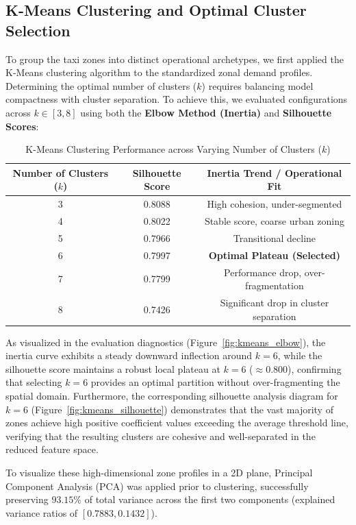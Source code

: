 \documentclass[11pt,a4paper]{article}
\begin{document}
\subsection{K-Means Clustering and Optimal Cluster Selection}
To group the taxi zones into distinct operational archetypes, we first applied the K-Means clustering algorithm to the standardized zonal demand profiles. Determining the optimal number of clusters ($k$) requires balancing model compactness with cluster separation. To achieve this, we evaluated configurations across $k \in [3, 8]$ using both the \textbf{Elbow Method (Inertia)} and \textbf{Silhouette Scores}:
\begin{table}[htbp]
    \centering
    \caption{K-Means Clustering Performance across Varying Number of Clusters ($k$)}
    \label{tab:kmeans_evaluation}
    \begin{tabular}{ccc}
        \toprule
        \textbf{Number of Clusters ($k$)} & \textbf{Silhouette Score} & \textbf{Inertia Trend / Operational Fit} \\
        \midrule
        3 & 0.8088 & High cohesion, under-segmented \\
        4 & 0.8022 & Stable score, coarse urban zoning \\
        5 & 0.7966 & Transitional decline \\
        6 & 0.7997 & \textbf{Optimal Plateau (Selected)} \\
        7 & 0.7799 & Performance drop, over-fragmentation \\
        8 & 0.7426 & Significant drop in cluster separation \\
        \bottomrule
    \end{tabular}
\end{table}

As visualized in the evaluation diagnostics (Figure~\ref{fig:kmeans_elbow}), the inertia curve exhibits a steady downward inflection around $k = 6$, while the silhouette score maintains a robust local plateau at $k = 6$ ($\approx 0.800$), confirming that selecting $k = 6$ provides an optimal partition without over-fragmenting the spatial domain. Furthermore, the corresponding silhouette analysis diagram for $k = 6$ (Figure~\ref{fig:kmeans_silhouette}) demonstrates that the vast majority of zones achieve high positive coefficient values exceeding the average threshold line, verifying that the resulting clusters are cohesive and well-separated in the reduced feature space. 

To visualize these high-dimensional zone profiles in a 2D plane, Principal Component Analysis (PCA) was applied prior to clustering, successfully preserving $93.15\%$ of total variance across the first two components (explained variance ratios of $[0.7883, 0.1432]$).
\end{document}
